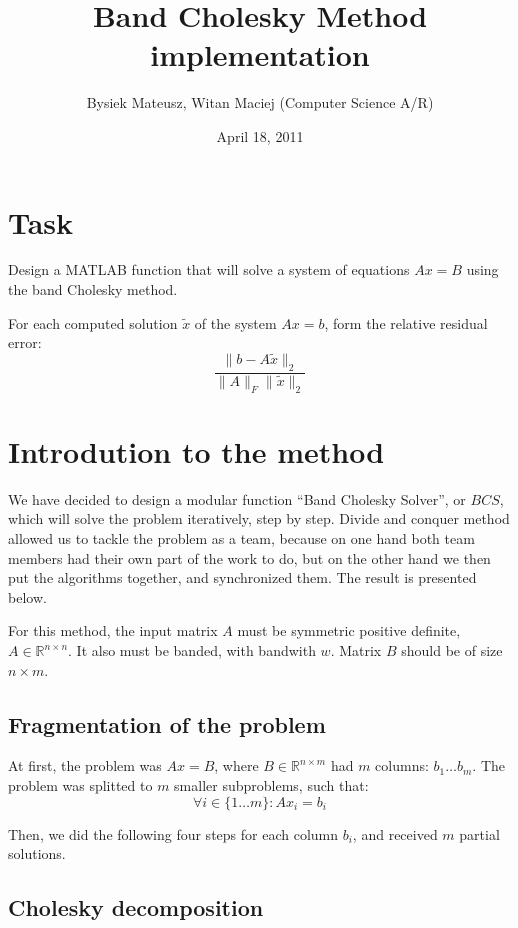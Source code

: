 \documentclass{article}
\begin{document}
\title{Band Cholesky Method implementation}
\date{April 18, 2011}
\author{Bysiek Mateusz, Witan Maciej (Computer Science A/R)}
\maketitle

\section{Task}

Design a MATLAB function that will solve a system of equations $Ax=B$ using the
band Cholesky method.

For each computed solution $\tilde{x}$ of the system $Ax=b$, form the relative
residual error:
\[ \frac{ \|b-A\tilde{x}\|_2 }{ \|A\|_F \|\tilde{x}\|_2 } \]

\section{Introdution to the method}

We have decided to design a modular function ``Band Cholesky Solver'', or $BCS$,
which will solve the problem iteratively, step by step. Divide and conquer
method allowed us to tackle the problem as a team, because on one hand both
team members had their own part of the work to do, but on the other hand we
then put the algorithms together, and synchronized them. The result is presented
below.

For this method, the input matrix $A$ must be symmetric positive definite, $A
\in \mathbb{R}^{n \times n}$. It also must be banded, with bandwith $w$. Matrix
$B$ should be of size $n \times m$.

\subsection{Fragmentation of the problem}

At first, the problem was $Ax = B$, where $B \in \mathbb{R}^{n \times m}$ had
$m$ columns: $b_1 \ldots b_m$. The problem was splitted to $m$ smaller
subproblems, such that: \[ \forall i \in \{1 \ldots m\} : Ax_i = b_i \]

Then, we did the following four steps for each column $b_i$, and received $m$
partial solutions.

\subsection{Cholesky decomposition}
\end{document}
